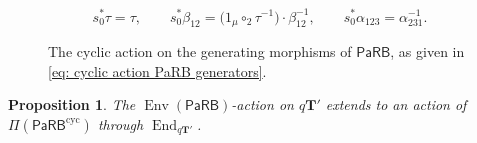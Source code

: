 \documentclass[10pt,a4paper]{amsart}
\newtheorem{prop}{Proposition}
\newcommand{\End}{\operatorname{End}}
\newcommand{\Env}{\operatorname{Env}}
\newcommand{\PaRB}{\mathsf{PaRB}}
\newcommand{\bT}{\mathbf{T}}
\newcommand{\twist}{\tau}
\begin{document}
\begin{equation}
\label{eq: cyclic action PaRB generators}
s_0^*\twist = \twist,
\qquad
s_0^*\beta_{12}
= \bigl(1_\mu\circ_2\twist^{-1}\bigr)\cdot\beta_{12}^{-1},
\qquad
s_0^*\alpha_{123} = \alpha_{231}^{-1}.
\end{equation}

\begin{figure}[h]
    \centering
    
    \caption{The cyclic action on the generating morphisms of $\PaRB$,
as given in \eqref{eq: cyclic action PaRB generators}.}
    \label{fig:cyclic_action_on_PaRB}
\end{figure}

\begin{prop}
\label{prop: metric prop action through cyclic endomorphisms}
The $\Env(\PaRB)$-action on $q\bT'$ extends to an action of
$\Pi(\PaRB^{\mathrm{cyc}})$ through $\End_{q\bT'}$.
\end{prop}
\end{document}
